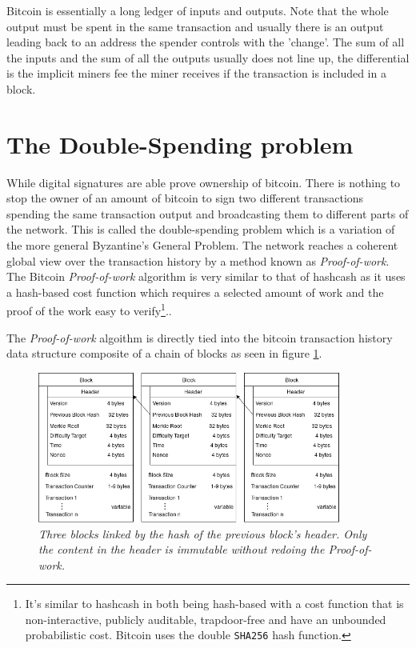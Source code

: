 Bitcoin is essentially a long ledger of inputs and outputs. Note that the whole output must be spent in the same transaction and usually there is an output leading back to an address the spender controls with the 'change'. The sum of all the inputs and the sum of all the outputs usually does not line up, the differential is the implicit miners fee the miner receives if the transaction is included in a block. 

\section{The Double-Spending problem}

While digital signatures are able prove ownership of bitcoin. There is nothing to stop the owner of an amount of bitcoin to sign two different transactions spending the same transaction output and broadcasting them to different parts of the network. This is called the double-spending problem which is a variation of the more general Byzantine's General Problem. The network reaches a coherent global view over the transaction history by a method known as \textit{Proof-of-work}. The Bitcoin \textit{Proof-of-work} algorithm is very similar to that of hashcash as it uses a hash-based cost function which requires a selected amount of work and the proof of the work easy to verify\cite{back:hashcash}\footnote{It's similar to hashcash in both being hash-based with a cost function that is non-interactive, publicly auditable, trapdoor-free and have an unbounded probabilistic cost\cite{back:hashcash}.
Bitcoin uses the double \texttt{SHA256} hash function.}..

The \textit{Proof-of-work} algoithm is directly tied into the bitcoin transaction history data structure composite of a chain of blocks as seen in figure \ref{fig:blockchain}.

\begin{figure}[!htb]
	\hspace*{-0.4cm} 
	\centering
	\includegraphics[width=10cm]{blockchain.png}
	\caption{\textit{Three blocks linked by the hash of the previous block's header. Only the content in the header is immutable without redoing the \textit{Proof-of-work}.
	}}
	\label{fig:blockchain}
	\hspace{2mm} 
\end{figure}

